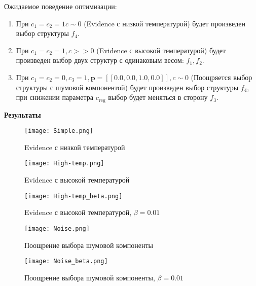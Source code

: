 \documentclass[12pt]{article}
\begin{document}
Ожидаемое поведение оптимизации:
\begin{enumerate}
\item При $c_1 = c_2 = 1 c \sim 0$ (Evidence с низкой температурой) будет произведен выбор структуры $f_4$.

\item При $c_1 = c_2 = 1, c >>0$ (Evidence с высокой температурой) будет произведен выбор двух структур с одинаковым весом: $f_1, f_2$.

\item При $c_1 = c_2 = 0, c_3 = 1, \mathbf{p}= [[0.0, 0.0, 1.0, 0.0]], c \sim 0$ (Поощряется выбор структуры с шумовой компонентой) будет произведен выбор структуры $f_4$, при снижении параметра $c_{\text{reg}}$ выбор будет меняться в сторону $f_3$.
\end{enumerate}

\textbf{Результаты}\\
\begin{figure}
\texttt{[image: Simple.png]}
\caption{Evidence с низкой температурой}
\end{figure}

\begin{figure}
\texttt{[image: High-temp.png]}
\caption{Evidence с высокой температурой}
\end{figure}


\begin{figure}
\texttt{[image: High-temp\_beta.png]}
\caption{Evidence с высокой температурой, $\beta = 0.01$}
\end{figure}


\begin{figure}
\texttt{[image: Noise.png]}
\caption{Поощрение выбора шумовой компоненты}
\end{figure}


\begin{figure}
\texttt{[image: Noise\_beta.png]}
\caption{Поощрение выбора шумовой компоненты, $\beta = 0.01$}
\end{figure}
\end{document}
